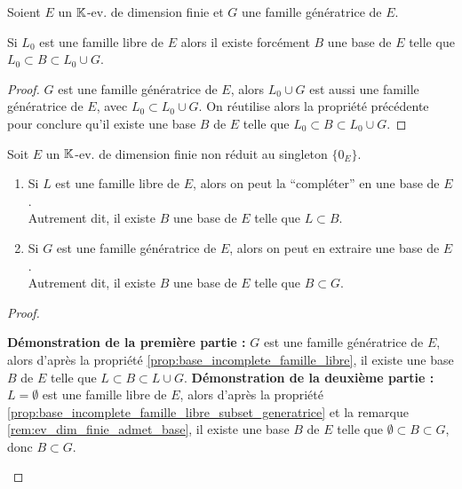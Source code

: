 \documentclass[12pt,a4paper]{report}
\begin{document}
\begin{property}
    Soient $E$ un $\mathbb{K}$-ev. de dimension finie et $G$ une famille génératrice de $E$.

    Si $L_0$ est une famille libre de $E$ alors il existe forcément $B$ une base de $E$ telle que $L_0 \subset B \subset L_0\cup G$.
    \label{prop:base_incomplete_famille_libre}
\end{property}

\begin{proof}
    $G$ est une famille génératrice de $E$, alors $L_0 \cup G$ est aussi une famille génératrice de $E$, avec $L_0 \subset L_0 \cup G$. On réutilise alors la propriété précédente pour conclure qu'il existe une base $B$ de $E$ telle que $L_0 \subset B \subset L_0 \cup G$.
\end{proof}

\begin{theorem}
    Soit $E$ un $\mathbb{K}$-ev. de dimension finie non réduit au singleton $\{0_E\}$.
    \begin{enumerate}
        \item Si $L$ est une famille libre de $E$, alors on peut la ``compléter'' en une base de $E$.\\Autrement dit, il existe $B$ une base de $E$ telle que $L \subset B$.
        \item Si $G$ est une famille génératrice de $E$, alors on peut en extraire une base de $E$.\\Autrement dit, il existe $B$ une base de $E$ telle que $B \subset G$.
    \end{enumerate}
    \label{thm:base_incomplete}
\end{theorem}

\begin{proof}
    \begin{outline}
        \1 \textbf{Démonstration de la première partie :}
            \2 $G$ est une famille génératrice de $E$, alors d'après la propriété \ref{prop:base_incomplete_famille_libre}, il existe une base $B$ de $E$ telle que $L \subset B \subset L \cup G$.
        \1 \textbf{Démonstration de la deuxième partie :}
            \2 $L = \emptyset$ est une famille libre de $E$, alors d'après la propriété \ref{prop:base_incomplete_famille_libre_subset_generatrice} et la remarque \ref{rem:ev_dim_finie_admet_base}, il existe une base $B$ de $E$ telle que $\emptyset \subset B \subset G$, donc $B \subset G$.
    \end{outline}
\end{proof}
\end{document}
